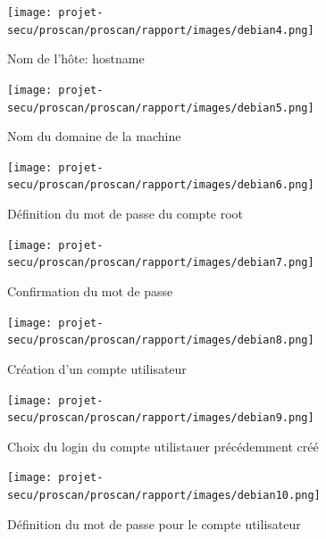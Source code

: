 \documentclass[11pt,a4paper,titlepage, oneside]{article}
\begin{document}
	\newpage
                \begin{figure}[h]
                        \centering
                        \texttt{[image: projet-secu/proscan/proscan/rapport/images/debian4.png]}
                        \caption{Nom de l'hôte: hostname}
                \end{figure}

	 \newpage
                \begin{figure}[h]
                        \centering
                        \texttt{[image: projet-secu/proscan/proscan/rapport/images/debian5.png]}
                        \caption{Nom du domaine de la machine}
                \end{figure}

	 \newpage
                \begin{figure}[h]
                        \centering
                        \texttt{[image: projet-secu/proscan/proscan/rapport/images/debian6.png]}
                        \caption{Définition du mot de passe du compte root}
                \end{figure}


	 \newpage
                \begin{figure}[h]
                        \centering
                        \texttt{[image: projet-secu/proscan/proscan/rapport/images/debian7.png]}
                        \caption{Confirmation du mot de passe}
                \end{figure}

	 \newpage
                \begin{figure}[h]
                        \centering
                        \texttt{[image: projet-secu/proscan/proscan/rapport/images/debian8.png]}
                        \caption{Création d'un compte utilisateur}
                \end{figure}

	 \newpage
                \begin{figure}[h]
                        \centering
                        \texttt{[image: projet-secu/proscan/proscan/rapport/images/debian9.png]}
                        \caption{Choix du login du compte utilistauer précédemment créé}
                \end{figure}

	 \newpage
                \begin{figure}[h]
                        \centering
                        \texttt{[image: projet-secu/proscan/proscan/rapport/images/debian10.png]}
                        \caption{Définition du mot de passe pour le compte utilisateur}
                \end{figure}
\end{document}
